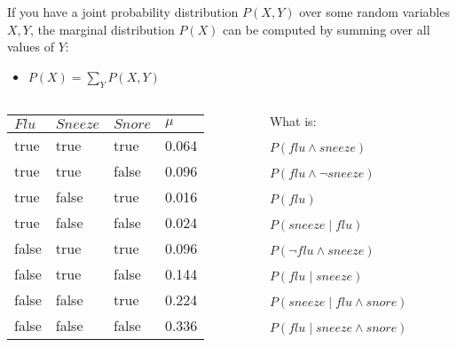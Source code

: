 \documentclass[12pt]{beamer} %
\begin{document}
\begin{slide}

If you have a joint probability distribution $P(X,Y)$ over some random variables $X,Y$,
the marginal distribution $P(X)$ can be computed by summing over all values of $Y$:

\begin{itemize}
\item $P(X) = \sum_Y P(X,Y)$
\end{itemize}

\end{slide}




\begin{slide}
\begin{columns}
\begin{column}{6cm}
\begin{tabular}{|lll|l|}\hline
$Flu$ &  $Sneeze$ & $Snore$ & $\mu$\\
\hline
true & true & true & 0.064 \\
true & true & false & 0.096 \\
true & false & true & 0.016\\
true & false & false & 0.024 \\
false & true & true & 0.096 \\
false & true & false & 0.144 \\
false & false & true & 0.224 \\
false & false & false & 0.336 \\\hline
\end{tabular}
\end{column}

\begin{column}{6cm}
What is:
\begin{enumeratea}
\item $P(flu \land sneeze)$ %
\item $P(flu \land \neg sneeze)$ %
\item $P(flu)$ %
\item $P(sneeze\mid flu)$ %
\item $P(\neg flu  \land sneeze)$ %
\item $P(flu \mid sneeze)$ %
\item $P(sneeze\mid flu \land snore)$ %
\item $P(flu\mid sneeze \land snore)$ %
\end{enumeratea}
\end{column}
\end{columns}
\end{slide}
\end{document}
